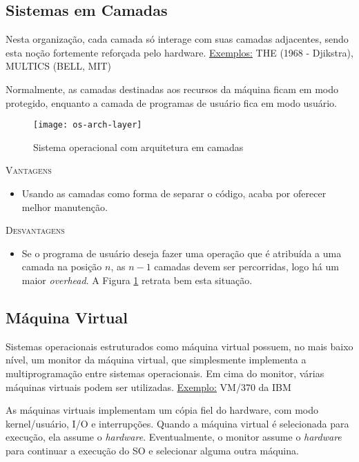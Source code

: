 \subsection{Sistemas em Camadas}
Nesta organização, cada camada só interage com suas camadas adjacentes, sendo esta noção fortemente reforçada pelo hardware.
\underline{Exemplos:} THE (1968 - Djikstra), MULTICS (BELL, MIT)

Normalmente, as camadas destinadas aos recursos da máquina ficam em modo protegido, enquanto a camada de programas de usuário fica em modo usuário.

\begin{figure}[ht]
  \centering
  \texttt{[image: os-arch-layer]}
  \caption{Sistema operacional com arquitetura em camadas}
  \label{fig:os-arch-layer}
\end{figure}

\textsc{Vantagens}
\begin{itemize}
  \item Usando as camadas como forma de separar o código, acaba por oferecer melhor manutenção.
\end{itemize}

\textsc{Desvantagens}
\begin{itemize}
  \item Se o programa de usuário deseja fazer uma operação que é atribuída a uma camada na posição $n$, as $n-1$ camadas devem ser percorridas, logo há um maior \textit{overhead}. A Figura \ref{fig:os-arch-layer} retrata bem esta situação.
\end{itemize}








\subsection{Máquina Virtual}
Sistemas operacionais estruturados como máquina virtual possuem, no mais baixo nível, um monitor da máquina virtual, que simplesmente implementa a multiprogramação entre sistemas operacionais. Em cima do monitor, várias máquinas virtuais podem ser utilizadas.
\underline{Exemplo:} VM/370 da IBM

As máquinas virtuais implementam um cópia fiel do hardware, com modo kernel/usuário, I/O e interrupções. Quando a máquina virtual é selecionada para execução, ela assume o \textit{hardware}. Eventualmente, o monitor assume o \textit{hardware} para continuar a execução do SO e selecionar alguma outra máquina.


